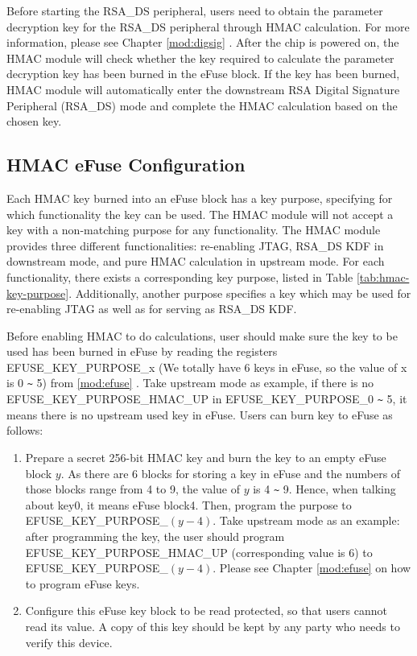 \documentclass[main\_\_EN.tex]{subfiles}
\begin{document}
Before starting the RSA\_DS peripheral, users need to obtain the parameter decryption key for the RSA\_DS peripheral through HMAC calculation. For more information, please see Chapter \ref{mod:digsig} \textit{}.
After the chip is powered on, the HMAC module will check whether the key required to calculate the parameter decryption key has been burned in the eFuse block. If the key has been burned, HMAC module will automatically enter the downstream RSA Digital Signature Peripheral (RSA\_DS) mode and complete the HMAC calculation based on the chosen key.

\subsection{HMAC eFuse Configuration}
\label{sec:hmac-config-function}

Each HMAC key burned into an eFuse block has a key purpose, specifying for which functionality the key can be used. The HMAC module will not accept a key with a non-matching purpose for any functionality. The HMAC module provides three different functionalities: re-enabling JTAG, RSA\_DS KDF in downstream mode, and pure HMAC calculation in upstream mode. For each functionality, there exists a corresponding key purpose, listed in Table \ref{tab:hmac-key-purpose}. Additionally, another purpose specifies a key which may be used for re-enabling JTAG as well as for serving as RSA\_DS KDF.

Before enabling HMAC to do calculations, user should make sure the key to be used has been burned in eFuse by reading the registers EFUSE\_KEY\_PURPOSE\_x (We totally have 6 keys in eFuse, so the value of x is 0 \verb+~+ 5) from \ref{mod:efuse} \textit{}. Take upstream mode as example, if there is no EFUSE\_KEY\_PURPOSE\_HMAC\_UP in EFUSE\_KEY\_PURPOSE\_0 \verb+~+ 5, it means there is no upstream used key in eFuse. Users can burn key to eFuse as follows:

\begin{enumerate}
    \item Prepare a secret 256-bit HMAC key and burn the key to an empty eFuse block $y$. As there are 6 blocks for storing a key in eFuse and the numbers of those blocks range from 4 to 9, the value of $y$ is 4 \verb+~+ 9. Hence, when talking about key0, it means eFuse block4. Then, program the purpose to EFUSE\_KEY\_PURPOSE\_$(y-4)$. Take upstream mode as an example: after programming the key, the user should program EFUSE\_KEY\_PURPOSE\_HMAC\_UP (corresponding value is 6) to EFUSE\_KEY\_PURPOSE\_$(y-4)$. Please see Chapter \ref{mod:efuse} \textit{} on how to program eFuse keys.
    \item Configure this eFuse key block to be read protected, so that users cannot read its value. A copy of this key should be kept by any party who needs to verify this device.
\end{enumerate}
\end{document}
